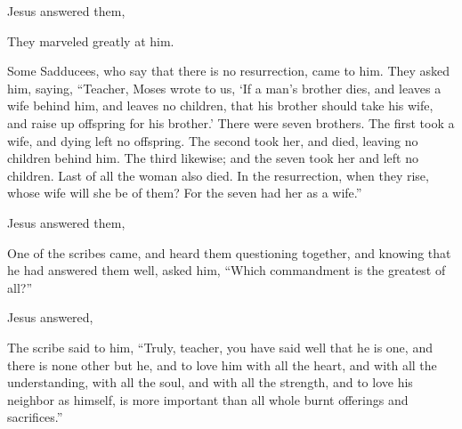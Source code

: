 {\par }{\PP {}Jesus answered them,
{}
\par }{\PP They marveled greatly at him.
\par }{\PP {}Some Sadducees, who say that there is no resurrection, came to him. They asked him, saying,
“Teacher, Moses wrote to us, ‘If a man’s brother dies, and leaves a wife behind him, and leaves no children, that his brother should take his wife, and raise up offspring for his brother.’
There were seven brothers. The first took a wife, and dying left no offspring.
The second took her, and died, leaving no children behind him. The third likewise;
and the seven took her and left no children. Last of all the woman also died.
In the resurrection, when they rise, whose wife will she be of them? For the seven had her as a wife.”
\par }{\PP {}Jesus answered them,
{}
\par }{\PP {}One of the scribes came, and heard them questioning together, and knowing that he had answered them well, asked him, “Which commandment is the greatest of all?”
\par }{\PP {}Jesus answered,
{}
{}
{}
\par }{\PP {}The scribe said to him, “Truly, teacher, you have said well that he is one, and there is none other but he,
and to love him with all the heart, and with all the understanding, with all the soul, and with all the strength, and to love his neighbor as himself, is more important than all whole burnt offerings and sacrifices.”
}
